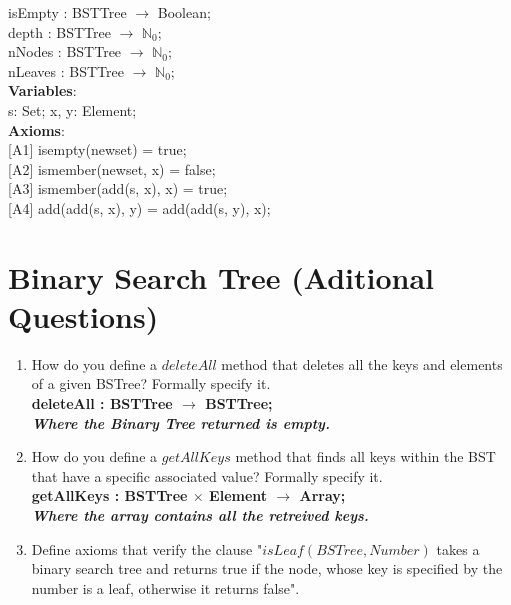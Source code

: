 \documentclass[12pt]{article}
\begin{document}
\begin{spacing}{1.5}
\hspace*{5mm} isEmpty : BSTTree $\rightarrow$ Boolean;\\
\hspace*{5mm} depth : BSTTree $\rightarrow$ $\mathbb{N}_0$;\\
\hspace*{5mm} nNodes : BSTTree $\rightarrow$ $\mathbb{N}_0$;\\
\hspace*{5mm} nLeaves : BSTTree $\rightarrow$ $\mathbb{N}_0$;\\
\noindent \textbf{Variables}:\\
\hspace*{5mm} s: Set; x, y: Element;\\
\noindent \textbf{Axioms}:\\
\hspace*{5mm} [A1] isempty(newset) = true;\\
\hspace*{5mm} [A2] ismember(newset, x) = false;\\
\hspace*{5mm} [A3] ismember(add(s, x), x) = true;\\
\hspace*{5mm} [A4] add(add(s, x), y) = add(add(s, y), x);\\

\section*{Binary Search Tree (Aditional Questions)}

\begin{enumerate}

\item How do you define a $deleteAll$ method that deletes all the keys and elements of a given BSTree? Formally specify it.\\
\textbf{deleteAll : BSTTree $\rightarrow$ BSTTree; \\ \textit{Where the Binary Tree returned is empty.}}

\item How do you define a $getAllKeys$ method that finds all keys within the BST that have a specific associated value? Formally specify it.\\
\textbf{getAllKeys : BSTTree $\times$ Element $\rightarrow$ Array; \\ \textit{Where the array contains all the retreived keys.}}

\item Define axioms that verify the clause "$isLeaf(BSTree, Number)$ takes a binary search tree and returns true if the node, whose key is specified by the number is a leaf, otherwise it returns false".\\


\end{enumerate}
\end{spacing}
\end{document}
